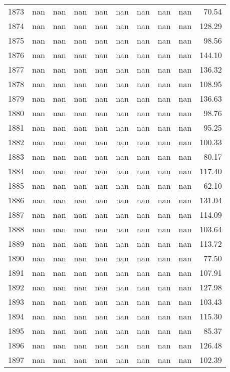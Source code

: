 \begin{tabular}{lrrrrrrrrr}
1873 & nan & nan & nan & nan & nan & nan & nan & nan & 70.54 \\
1874 & nan & nan & nan & nan & nan & nan & nan & nan & 128.29 \\
1875 & nan & nan & nan & nan & nan & nan & nan & nan & 98.56 \\
1876 & nan & nan & nan & nan & nan & nan & nan & nan & 144.10 \\
1877 & nan & nan & nan & nan & nan & nan & nan & nan & 136.32 \\
1878 & nan & nan & nan & nan & nan & nan & nan & nan & 108.95 \\
1879 & nan & nan & nan & nan & nan & nan & nan & nan & 136.63 \\
1880 & nan & nan & nan & nan & nan & nan & nan & nan & 98.76 \\
1881 & nan & nan & nan & nan & nan & nan & nan & nan & 95.25 \\
1882 & nan & nan & nan & nan & nan & nan & nan & nan & 100.33 \\
1883 & nan & nan & nan & nan & nan & nan & nan & nan & 80.17 \\
1884 & nan & nan & nan & nan & nan & nan & nan & nan & 117.40 \\
1885 & nan & nan & nan & nan & nan & nan & nan & nan & 62.10 \\
1886 & nan & nan & nan & nan & nan & nan & nan & nan & 131.04 \\
1887 & nan & nan & nan & nan & nan & nan & nan & nan & 114.09 \\
1888 & nan & nan & nan & nan & nan & nan & nan & nan & 103.64 \\
1889 & nan & nan & nan & nan & nan & nan & nan & nan & 113.72 \\
1890 & nan & nan & nan & nan & nan & nan & nan & nan & 77.50 \\
1891 & nan & nan & nan & nan & nan & nan & nan & nan & 107.91 \\
1892 & nan & nan & nan & nan & nan & nan & nan & nan & 127.98 \\
1893 & nan & nan & nan & nan & nan & nan & nan & nan & 103.43 \\
1894 & nan & nan & nan & nan & nan & nan & nan & nan & 115.30 \\
1895 & nan & nan & nan & nan & nan & nan & nan & nan & 85.37 \\
1896 & nan & nan & nan & nan & nan & nan & nan & nan & 126.48 \\
1897 & nan & nan & nan & nan & nan & nan & nan & nan & 102.39 \\

\end{tabular}
